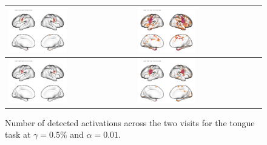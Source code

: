 \documentclass{article}
\begin{document}
\begin{figure}
\begin{tabularx}{\textwidth}{|X|X|}
		\includegraphics[width=0.48\textwidth]{plots/603_subject_111312_thr05_alpha001_num_active_classical.png} &
		\includegraphics[width=0.48\textwidth]{plots/603_subject_111312_thr05_alpha001_num_active.png} \\ \hline
		\includegraphics[width=0.48\textwidth]{plots/603_subject_114823_thr05_alpha001_num_active_classical.png} &
		\includegraphics[width=0.48\textwidth]{plots/603_subject_114823_thr05_alpha001_num_active.png} \\ \hline
	\end{tabularx}
	\caption{Number of detected activations across the two visits for the tongue task at $\gamma=0.5\%$ and $\alpha = 0.01$.}
	\label{fig:tongue_act_single_subject_two_visits}
\end{figure}
	
\end{document}
